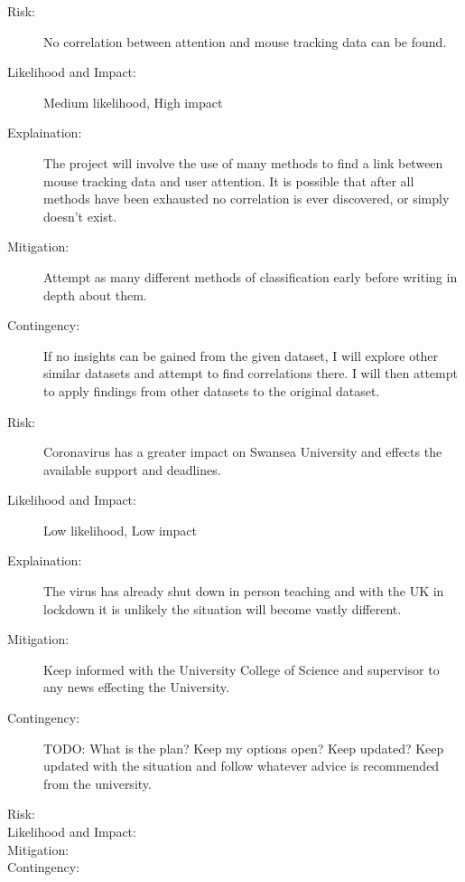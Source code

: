\documentclass{article}
\begin{document}
\begin{description}
    \item[Risk:]    
    No correlation between attention and mouse tracking data can be found.    
    \item[Likelihood and Impact:]
    Medium likelihood, High impact
    \item[Explaination:]
    The project will involve the use of many methods to find a link between mouse tracking data and user attention.
    It is possible that after all methods have been exhausted no correlation is ever discovered, or simply doesn't exist. 
    \item[Mitigation:]
    Attempt as many different methods of classification early before writing in depth about them.  
    \item[Contingency:]
    If no insights can be gained from the given dataset, I will explore other similar datasets and attempt to find correlations there.
    I will then attempt to apply findings from other datasets to the original dataset. 
\end{description}

\begin{description}
    \item[Risk:]    
    Coronavirus has a greater impact on Swansea University and  effects the available support and deadlines.
    \item[Likelihood and Impact:]
    Low likelihood, Low impact
    \item[Explaination:]
    The virus has already shut down in person teaching and with the UK in lockdown it is unlikely the situation will become vastly different. 
    \item[Mitigation:]
    Keep informed with the University College of Science and supervisor to any news effecting the University.
    \item[Contingency:]
    TODO: What is the plan? Keep my options open? Keep updated?
    Keep updated with the situation and follow whatever advice is recommended from the university.
\end{description}

\begin{description}
    \item[Risk:]    
    \item[Likelihood and Impact:]
    \item[Mitigation:]
    \item[Contingency:]
\end{description}
\end{document}
